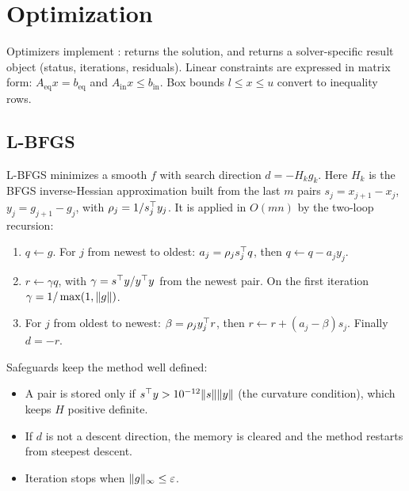 \chapter{Optimization}\label{c:sec:optimization}

Optimizers implement :  returns the
solution, and  returns a solver-specific result object (status, iterations,
residuals). Linear constraints are expressed in matrix form:
$A_{\text{eq}}x=b_{\text{eq}}$ and $A_{\text{in}}x\le b_{\text{in}}$. Box bounds
$l\le x\le u$ convert to inequality rows.
\begin{codepointers}
\end{codepointers}

\section{L-BFGS}\label{c:sec:lbfgs}
L-BFGS minimizes a smooth $f$ with search direction $d=-H_kg_k$. Here $H_k$ is the BFGS
inverse-Hessian approximation built from the last $m$ pairs
$s_j=x_{j+1}-x_j$, $y_j=g_{j+1}-g_j$, with $\rho_j=1/s_j^\top y_j$. It is applied in $O(mn)$
by the two-loop recursion:
\begin{enumerate}
  \item $q\leftarrow g$. For $j$ from newest to oldest: $a_j=\rho_js_j^\top q$, then
        $q\leftarrow q-a_jy_j$.
  \item $r\leftarrow\gamma q$, with $\gamma=s^\top y/y^\top y$ from the newest pair. On the
        first iteration $\gamma=1/\max(1,\lVert g\rVert)$.
  \item For $j$ from oldest to newest: $\beta=\rho_jy_j^\top r$, then
        $r\leftarrow r+(a_j-\beta)s_j$. Finally $d=-r$.
\end{enumerate}
Safeguards keep the method well defined:
\begin{itemize}
  \item A pair is stored only if $s^\top y>10^{-12}\lVert s\rVert\lVert y\rVert$ (the curvature
        condition), which keeps $H$ positive definite.
  \item If $d$ is not a descent direction, the memory is cleared and the method restarts
        from steepest descent.
  \item Iteration stops when $\lVert g\rVert_\infty\le\varepsilon$.
\end{itemize}

